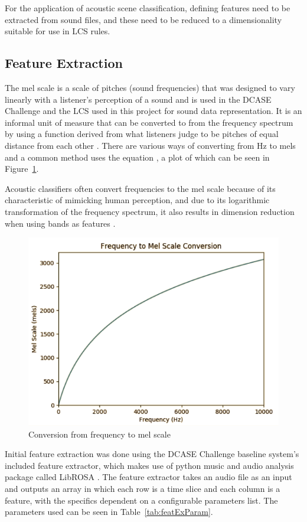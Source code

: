 \documentclass[11pt]{article}
\begin{document}
For the application of acoustic scene classification, defining features need to be extracted from sound files, and these need to be reduced to a dimensionality suitable for use in LCS rules.




\subsection{Feature Extraction}
\label{sec:featExt}

The mel scale is a scale of pitches (sound frequencies) that was designed to vary linearly with a listener's perception of a sound and is used in the DCASE Challenge and the LCS used in this project for sound data representation. It is an informal unit of measure that can be converted to from the frequency spectrum by using a function derived from what listeners judge to be pitches of equal distance from each other \cite{Luening1975}. There are various ways of converting from Hz to mels and a common method uses the equation  \cite{OShaughnessy1987}, a plot of which can be seen in Figure~\ref{fig:hz2mel}.

Acoustic classifiers often convert frequencies to the mel scale because of its characteristic of mimicking human perception, and due to its logarithmic transformation of the frequency spectrum, it also results in dimension reduction when using bands as features \cite{Stowell2014}.

\begin{figure}[!htbp]
	\centering
	\includegraphics[width=0.5\linewidth]{figures/hz2mel.png}
	\caption{Conversion from frequency to mel scale}
	\label{fig:hz2mel}
\end{figure}

Initial feature extraction was done using the DCASE Challenge baseline system's included feature extractor, which makes use of python music and audio analysis package called LibROSA \cite{Heittola2017}. The feature extractor takes an audio file as an input and outputs an array in which each row is a time slice and each column is a feature, with the specifics dependent on a configurable parameters list. The parameters used can be seen in Table~\ref{tab:featExParam}.
\end{document}
